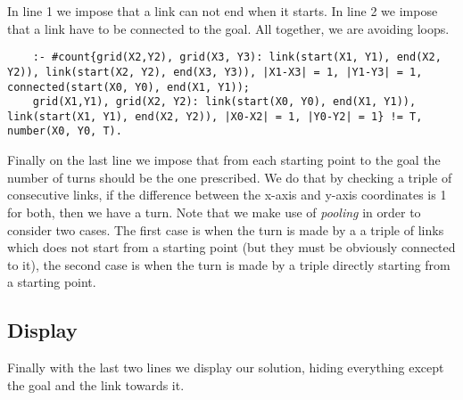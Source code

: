 In line 1 we  impose that a link can not end when it starts. In line 2 we impose that a link have to be connected to the goal. All together, we are avoiding loops.

\begin{verbatim}
    :- #count{grid(X2,Y2), grid(X3, Y3): link(start(X1, Y1), end(X2, Y2)), link(start(X2, Y2), end(X3, Y3)), |X1-X3| = 1, |Y1-Y3| = 1, connected(start(X0, Y0), end(X1, Y1));
    grid(X1,Y1), grid(X2, Y2): link(start(X0, Y0), end(X1, Y1)), link(start(X1, Y1), end(X2, Y2)), |X0-X2| = 1, |Y0-Y2| = 1} != T, number(X0, Y0, T).
\end{verbatim}

Finally on the last line we impose that from each starting point to the goal the number of turns should be the one prescribed. We do that by checking a triple of consecutive links, if the difference between the x-axis and y-axis coordinates is 1 for both, then we have a turn.
 Note that we make use of \emph{pooling} in order to consider two cases. The first case is when the turn is made by a a triple of links which does not start from a starting point (but they must be obviously connected to it), the second case is when the turn is made by a triple directly starting from a starting point.

\subsection{Display}

Finally with the last two lines we display our solution, hiding everything except the goal and the link towards it.